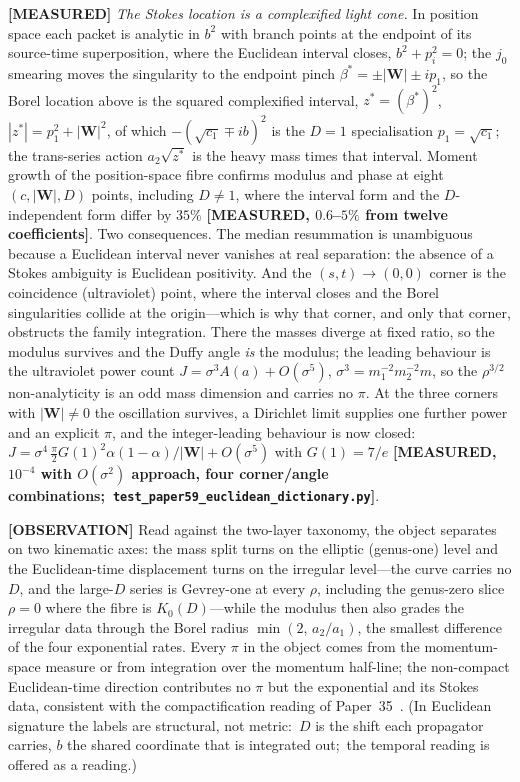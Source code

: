 \documentclass[aps,pra,twocolumn,superscriptaddress,longbibliography]{revtex4-2}
\begin{document}
\textbf{[MEASURED]} \emph{The Stokes location is a complexified light cone.} In position
space each packet is analytic in $b^{2}$ with branch points at the endpoint of its
source-time superposition, where the Euclidean interval closes, $b^{2}+p_{i}^{2}=0$; the
$j_{0}$ smearing moves the singularity to the endpoint pinch
$\beta^{*}=\pm|\bm W|\pm i p_{1}$, so the Borel location above is the squared complexified
interval, $z^{*}=(\beta^{*})^{2}$, $|z^{*}|=p_{1}^{2}+|\bm W|^{2}$, of which
$-(\sqrt{c_{1}}\mp ib)^{2}$ is the $D=1$ specialisation $p_{1}=\sqrt{c_{1}}$; the trans-series
action $a_{2}\sqrt{z^{*}}$ is the heavy mass times that interval. Moment growth of the
position-space fibre confirms modulus and phase at eight $(c,|\bm W|,D)$ points, including
$D\neq1$, where the interval form and the $D$-independent form differ by $35\%$
\textbf{[MEASURED, $0.6$--$5\%$ from twelve coefficients]}. Two consequences. The median
resummation is unambiguous because a Euclidean interval never vanishes at real separation:
the absence of a Stokes ambiguity is Euclidean positivity. And the $(s,t)\to(0,0)$ corner is
the coincidence (ultraviolet) point, where the interval closes and the Borel singularities
collide at the origin---which is why that corner, and only that corner, obstructs the family
integration. There the masses diverge at fixed ratio, so the modulus survives and the Duffy
angle \emph{is} the modulus; the leading behaviour is the ultraviolet power count
$J=\sigma^{3}A(a)+O(\sigma^{5})$, $\sigma^{3}=m_{1}^{-2}m_{2}^{-2}m$, so the $\rho^{3/2}$
non-analyticity is an odd mass dimension and carries no $\pi$. At the three corners with
$|\bm W|\neq0$ the oscillation survives, a Dirichlet limit supplies one further power and an
explicit $\pi$, and the integer-leading behaviour is now closed:
$J=\sigma^{4}\,\frac{\pi}{2}G(1)^{2}\alpha(1-\alpha)/|\bm W|+O(\sigma^{5})$ with $G(1)=7/e$
\textbf{[MEASURED, $10^{-4}$ with $O(\sigma^{2})$ approach, four corner/angle combinations;\
\texttt{test\_paper59\_euclidean\_dictionary.py}]}.

\textbf{[OBSERVATION]} Read against the two-layer taxonomy, the object separates on two
kinematic axes: the mass split turns on the elliptic (genus-one) level and the Euclidean-time
displacement turns on the irregular level---the curve carries no $D$, and the large-$D$ series
is Gevrey-one at every $\rho$, including the genus-zero slice $\rho=0$ where the fibre is
$K_{0}(D)$---while the modulus then also grades the irregular data through the Borel radius
$\min(2,\,a_{2}/a_{1})$, the smallest difference of the four exponential rates. Every $\pi$
in the object comes from the momentum-space measure or from integration over the momentum
half-line; the non-compact Euclidean-time direction contributes no $\pi$ but the exponential
and its Stokes data, consistent with the compactification reading of
Paper~35~\cite{loutey_paper35}.  (In Euclidean signature the labels are structural, not
metric:\ $D$ is the shift each propagator carries, $b$ the shared coordinate that is
integrated out;\ the temporal reading is offered as a reading.)
\end{document}
